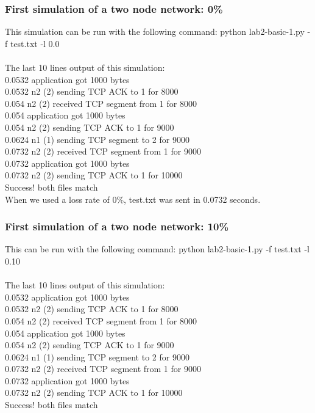 \documentclass[fleqn,11pt]{article}
\begin{document}
\subsubsection{First simulation of a two node network: 0\%}
This simulation can be run with the following command: python lab2-basic-1.py -f test.txt -l 0.0\\ \\
The last 10 lines output of this simulation:\\
0.0532 application got 1000 bytes\\
0.0532 n2 (2) sending TCP ACK to 1 for 8000\\
0.054 n2 (2) received TCP segment from 1 for 8000\\
0.054 application got 1000 bytes\\
0.054 n2 (2) sending TCP ACK to 1 for 9000\\
0.0624 n1 (1) sending TCP segment to 2 for 9000\\
0.0732 n2 (2) received TCP segment from 1 for 9000\\
0.0732 application got 1000 bytes\\
0.0732 n2 (2) sending TCP ACK to 1 for 10000\\
Success! both files match\\

When we used a loss rate of 0\%, test.txt was sent in 0.0732 seconds.

\subsubsection{First simulation of a two node network: 10\%}
This can be run with the following command: python lab2-basic-1.py -f test.txt -l 0.10\\ \\
The last 10 lines output of this simulation:\\
0.0532 application got 1000 bytes\\
0.0532 n2 (2) sending TCP ACK to 1 for 8000\\
0.054 n2 (2) received TCP segment from 1 for 8000\\
0.054 application got 1000 bytes\\
0.054 n2 (2) sending TCP ACK to 1 for 9000\\
0.0624 n1 (1) sending TCP segment to 2 for 9000\\
0.0732 n2 (2) received TCP segment from 1 for 9000\\
0.0732 application got 1000 bytes\\
0.0732 n2 (2) sending TCP ACK to 1 for 10000\\
Success! both files match\\
\end{document}
